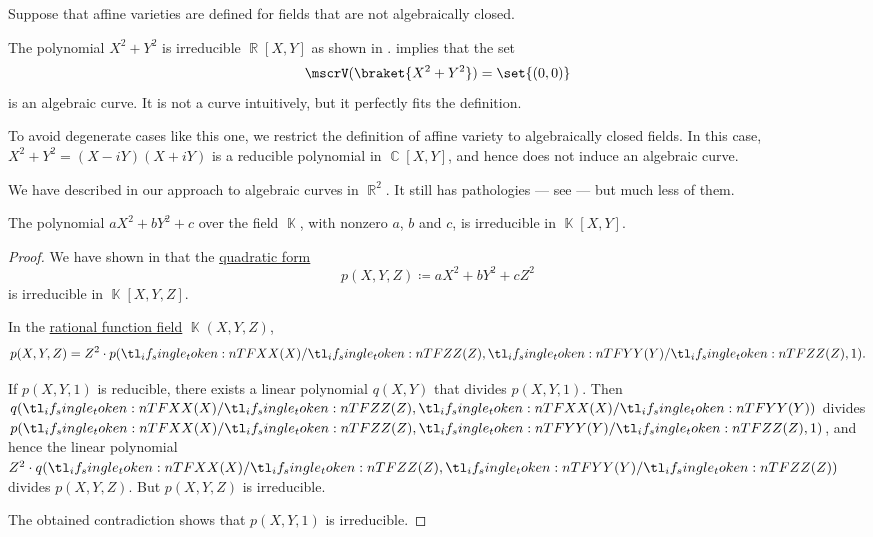 \begin{example}\label{ex:real_algebraic_curves}
  Suppose that affine varieties are defined for fields that are not algebraically closed.

  The polynomial \( X^2 + Y^2 \) is irreducible \( \BbbR[X, Y] \) as shown in .  implies that the set
  \begin{equation*}
    \mscrV(\braket{ X^2 + Y^2 }) = \set{ (0, 0) }
  \end{equation*}
  is an algebraic curve. It is not a curve intuitively, but it perfectly fits the definition.

  To avoid degenerate cases like this one, we restrict the definition of affine variety to algebraically closed fields. In this case, \( X^2 + Y^2 = (X - iY) (X + iY) \) is a reducible polynomial in \( \BbbC[X, Y] \), and hence does not induce an algebraic curve.

  We have described in  our approach to algebraic curves in \( \BbbR^2 \). It still has pathologies --- see  --- but much less of them.
\end{example}

\begin{lemma}\label{thm:x2_plus_y2_plus_1_irreducible}
  The polynomial \( a X^2 + b Y^2 + c \) over the field \( \BbbK \), with nonzero \( a \), \( b \) and \( c \), is irreducible in \( \BbbK[X, Y] \).
\end{lemma}
\begin{proof}
  We have shown in  that the \hyperref[thm:quadratic_forms]{quadratic form}
  \begin{equation*}
    p(X, Y, Z) \coloneqq a X^2 + b Y^2 + c Z^2
  \end{equation*}
  is irreducible in \( \BbbK[X, Y, Z] \).

  In the \hyperref[def:rational_function_field]{rational function field} \( \BbbK(X, Y, Z) \),
  \begin{equation*}
    p(X, Y, Z) = Z^2 \cdot p(\ifrac X Z, \ifrac Y Z, 1).
  \end{equation*}

  If \( p(X, Y, 1) \) is reducible, there exists a linear polynomial \( q(X, Y) \) that divides \( p(X, Y, 1) \). Then \( q(\ifrac X Z, \ifrac X Y) \) divides \( p(\ifrac X Z, \ifrac Y Z, 1) \), and hence the linear polynomial \( Z^2 \cdot q(\ifrac X Z, \ifrac Y Z) \) divides \( p(X, Y, Z) \). But \( p(X, Y, Z) \) is irreducible.

  The obtained contradiction shows that \( p(X, Y, 1) \) is irreducible.
\end{proof}

